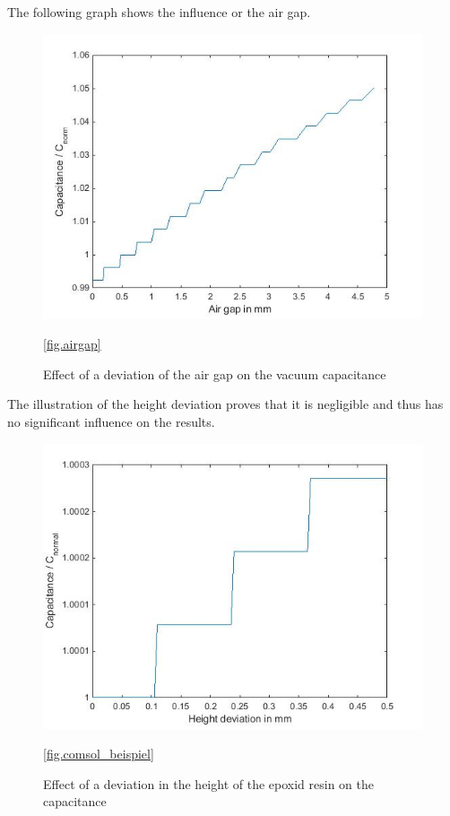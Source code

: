 The following graph shows the influence or the air gap. 
\begin{figure}[htbp]
	\centering
	\includegraphics[width=\textwidth]{figures/Results/airgap_height/airgap_graph.jpg}		
	\caption[Kurze Abbildungsbeschreibung]{Effect of a deviation of the air gap on the vacuum capacitance} \ref{fig.airgap}
	\label{fig.waveforms}
\end{figure}
 

The illustration of the height deviation proves that it is negligible and thus has no significant influence on the results. 
 \begin{figure}[htbp]
	\centering
	\includegraphics[width=\textwidth]{figures/Results/airgap_height/Height_deviation.jpg}		
	\caption[Kurze Abbildungsbeschreibung]{Effect of a deviation in the height of the epoxid resin on the capacitance} \ref{fig.comsol_beispiel}
	\label{fig.waveforms}
\end{figure}